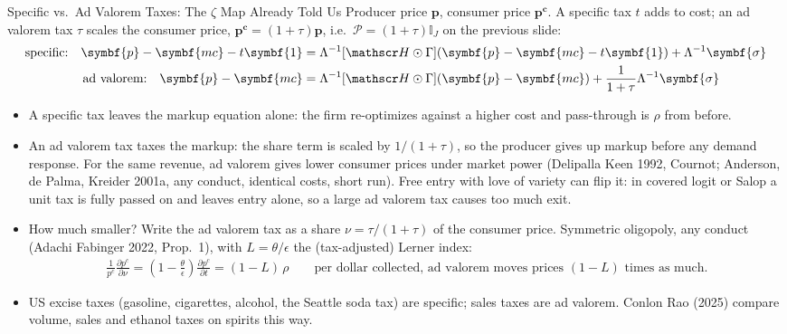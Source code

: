 \documentclass[aspectratio=169,10pt]{beamer}
\begin{document}
\begin{frame}{Specific vs.\ Ad Valorem Taxes: The $\zeta$ Map Already Told Us}
\footnotesize
Producer price $\symbf{p}$, consumer price $\symbf{p^c}$. A \alert{specific} tax $t$ adds to cost; an \alert{ad valorem} tax $\tau$ scales the consumer price, $\symbf{p^c} = (1+\tau)\symbf{p}$, i.e.\ $\mathcal{P} = (1+\tau)\mathbb{I}_J$ on the previous slide:
\begin{align*}
\text{specific:}\quad \symbf{p} - \symbf{mc} - t\symbf{1} &= \Lambda^{-1}[\calH \odot \Gamma](\symbf{p} - \symbf{mc} - t\symbf{1}) + \Lambda^{-1}\symbf{\sigma}\\
\text{ad valorem:}\quad \symbf{p} - \symbf{mc} &= \Lambda^{-1}[\calH \odot \Gamma](\symbf{p} - \symbf{mc}) + \frac{1}{1+\tau}\Lambda^{-1}\symbf{\sigma}
\end{align*}
\begin{itemize}
\item A specific tax leaves the markup equation alone: the firm re-optimizes against a higher cost and pass-through is $\rho$ from before.
\item An ad valorem tax \alert{taxes the markup}: the share term is scaled by $1/(1+\tau)$, so the producer gives up markup before any demand response. For the same revenue, ad valorem gives lower consumer prices under market power (Delipalla Keen 1992, Cournot; Anderson, de Palma, Kreider 2001a, any conduct, identical costs, short run). Free entry with love of variety can flip it: in covered logit or Salop a unit tax is fully passed on and leaves entry alone, so a large ad valorem tax causes too much exit.
\item How much smaller? Write the ad valorem tax as a share $\nu = \tau/(1+\tau)$ of the consumer price. Symmetric oligopoly, any conduct (Adachi Fabinger 2022, Prop.\ 1), with $L = \theta/\epsilon$ the (tax-adjusted) Lerner index:
\begin{align*}
\frac{1}{p^c}\frac{\partial p^c}{\partial \nu} = \left(1 - \frac{\theta}{\epsilon}\right)\frac{\partial p^c}{\partial t} = (1 - L)\, \rho
\qquad \text{per dollar collected, ad valorem moves prices } (1-L) \text{ times as much.}
\end{align*}
\item US excise taxes (gasoline, cigarettes, alcohol, the Seattle soda tax) are \alert{specific}; sales taxes are ad valorem. Conlon Rao (2025) compare volume, sales and ethanol taxes on spirits this way.
\end{itemize}
\end{frame}
\end{document}
